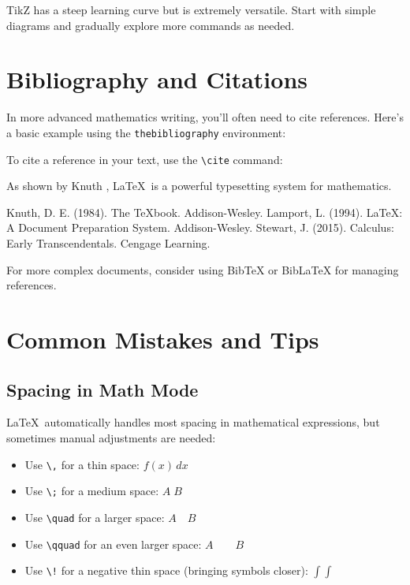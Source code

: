 \documentclass[11pt,a4paper]{article}
\begin{document}
\begin{tipbox}
TikZ has a steep learning curve but is extremely versatile. Start with simple diagrams and gradually explore more commands as needed.
\end{tipbox}

\section{Bibliography and Citations}

In more advanced mathematics writing, you'll often need to cite references. Here's a basic example using the \verb|thebibliography| environment:

To cite a reference in your text, use the \verb|\cite| command:

As shown by Knuth \cite{knuth1984texbook}, \LaTeX\ is a powerful typesetting system for mathematics.

\begin{thebibliography}{9}
     Knuth, D. E. (1984). The TeXbook. Addison-Wesley.
     Lamport, L. (1994). \LaTeX: A Document Preparation System. Addison-Wesley.
     Stewart, J. (2015). Calculus: Early Transcendentals. Cengage Learning.
\end{thebibliography}

\begin{notebox}
For more complex documents, consider using BibTeX or BibLaTeX for managing references.
\end{notebox}

\section{Common Mistakes and Tips}

\subsection{Spacing in Math Mode}

\LaTeX\ automatically handles most spacing in mathematical expressions, but sometimes manual adjustments are needed:

\begin{itemize}
    \item Use \verb|\,| for a thin space: $f(x)\,dx$
    \item Use \verb|\;| for a medium space: $A\;B$
    \item Use \verb|\quad| for a larger space: $A\quad B$
    \item Use \verb|\qquad| for an even larger space: $A\qquad B$
    \item Use \verb|\!| for a negative thin space (bringing symbols closer): $\int\!\!\!\int$
\end{itemize}
\end{document}
